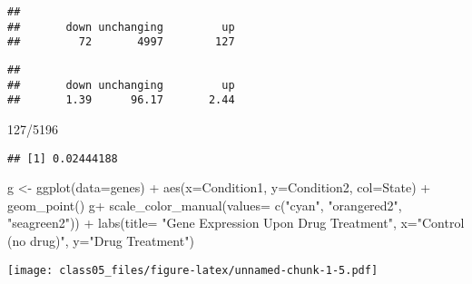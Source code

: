 \documentclass[
]{article}
\newenvironment{Shaded}{\begin{snugshade}}{\end{snugshade}}
\newcommand{\AttributeTok}[1]{\textcolor[rgb]{0.77,0.63,0.00}{#1}}
\newcommand{\CommentTok}[1]{\textcolor[rgb]{0.56,0.35,0.01}{\textit{#1}}}
\newcommand{\DecValTok}[1]{\textcolor[rgb]{0.00,0.00,0.81}{#1}}
\newcommand{\FunctionTok}[1]{\textcolor[rgb]{0.00,0.00,0.00}{#1}}
\newcommand{\NormalTok}[1]{#1}
\newcommand{\OtherTok}[1]{\textcolor[rgb]{0.56,0.35,0.01}{#1}}
\newcommand{\SpecialCharTok}[1]{\textcolor[rgb]{0.00,0.00,0.00}{#1}}
\newcommand{\StringTok}[1]{\textcolor[rgb]{0.31,0.60,0.02}{#1}}
\begin{document}
\begin{Shaded}
\end{Shaded}

\begin{verbatim}
## 
##       down unchanging         up 
##         72       4997        127
\end{verbatim}

\begin{Shaded}
\end{Shaded}

\begin{verbatim}
## 
##       down unchanging         up 
##       1.39      96.17       2.44
\end{verbatim}

\begin{Shaded}
\begin{Highlighting}[]
\DecValTok{127}\SpecialCharTok{/}\DecValTok{5196}
\end{Highlighting}
\end{Shaded}

\begin{verbatim}
## [1] 0.02444188
\end{verbatim}

\begin{Shaded}
\begin{Highlighting}[]
\NormalTok{g }\OtherTok{\textless{}{-}} \FunctionTok{ggplot}\NormalTok{(}\AttributeTok{data=}\NormalTok{genes) }\SpecialCharTok{+} 
  \FunctionTok{aes}\NormalTok{(}\AttributeTok{x=}\NormalTok{Condition1, }\AttributeTok{y=}\NormalTok{Condition2, }\AttributeTok{col=}\NormalTok{State) }\SpecialCharTok{+}
  \FunctionTok{geom\_point}\NormalTok{()}
\NormalTok{g}\SpecialCharTok{+} \FunctionTok{scale\_color\_manual}\NormalTok{(}\AttributeTok{values=} \FunctionTok{c}\NormalTok{(}\StringTok{"cyan"}\NormalTok{, }\StringTok{"orangered2"}\NormalTok{, }\StringTok{"seagreen2"}\NormalTok{)) }\SpecialCharTok{+} \FunctionTok{labs}\NormalTok{(}\AttributeTok{title=} \StringTok{"Gene Expression Upon Drug Treatment"}\NormalTok{, }\AttributeTok{x=}\StringTok{"Control (no drug)"}\NormalTok{, }\AttributeTok{y=}\StringTok{"Drug Treatment"}\NormalTok{)}
\end{Highlighting}
\end{Shaded}

\texttt{[image: class05\_files/figure-latex/unnamed-chunk-1-5.pdf]}
\end{document}
